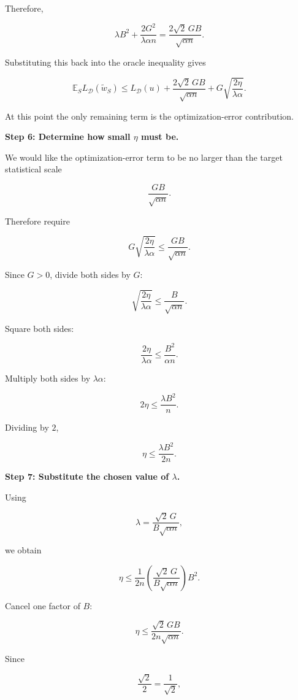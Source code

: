 \documentclass[11pt]{article}
\newcommand{\E}{\mathbb{E}}
\begin{document}
\begin{enumerate}
\begin{solutionbox}
Therefore,

\[
\lambda B^2
+
\frac{2G^2}
     {\lambda\alpha n}
=
\frac{2\sqrt2\,GB}
     {\sqrt{\alpha n}}.
\]

Substituting this back into the oracle inequality gives

\[
\boxed{
\E_S L_{\mathcal D}(\widetilde w_S)
\le
L_{\mathcal D}(u)
+
\frac{2\sqrt2\,GB}
     {\sqrt{\alpha n}}
+
G\sqrt{
\frac{2\eta}
     {\lambda\alpha}
}.
}
\]

At this point the only remaining term is the optimization-error contribution.

\medskip

\textbf{Step 6: Determine how small \(\eta\) must be.}

We would like the optimization-error term to be no larger than the target statistical scale

\[
\frac{GB}
     {\sqrt{\alpha n}}.
\]

Therefore require

\[
G\sqrt{
\frac{2\eta}
     {\lambda\alpha}
}
\le
\frac{GB}
     {\sqrt{\alpha n}}.
\]

Since \(G>0\), divide both sides by \(G\):

\[
\sqrt{
\frac{2\eta}
     {\lambda\alpha}
}
\le
\frac{B}
     {\sqrt{\alpha n}}.
\]

Square both sides:

\[
\frac{2\eta}
     {\lambda\alpha}
\le
\frac{B^2}
     {\alpha n}.
\]

Multiply both sides by \(\lambda\alpha\):

\[
2\eta
\le
\frac{\lambda B^2}{n}.
\]

Dividing by \(2\),

\[
\eta
\le
\frac{\lambda B^2}{2n}.
\]

\medskip

\textbf{Step 7: Substitute the chosen value of \(\lambda\).}

Using

\[
\lambda
=
\frac{\sqrt2\,G}
     {B\sqrt{\alpha n}},
\]

we obtain

\[
\eta
\le
\frac{1}{2n}
\left(
\frac{\sqrt2\,G}
     {B\sqrt{\alpha n}}
\right)
B^2.
\]

Cancel one factor of \(B\):

\[
\eta
\le
\frac{\sqrt2\,GB}
     {2n\sqrt{\alpha n}}.
\]

Since

\[
\frac{\sqrt2}{2}
=
\frac{1}{\sqrt2},
\]


\end{solutionbox}
\end{enumerate}
\end{document}
